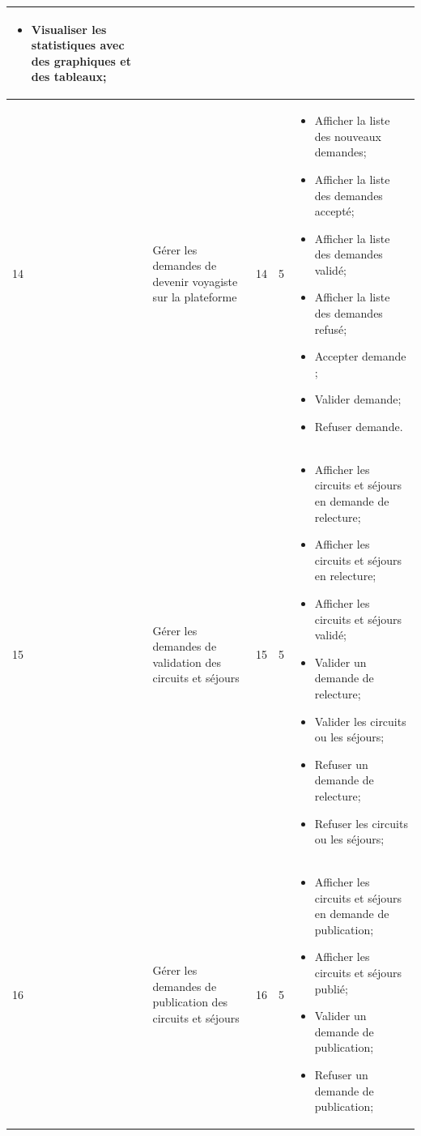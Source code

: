\documentclass[12pt]{report}
\begin{document}
\begin{longtable}{|p{1cm}|p{3cm}|p{2cm}|p{2cm}|p{6cm}|}
						\begin{itemize}
							\item Visualiser les statistiques avec des graphiques et des tableaux;
						\end{itemize}
						\\
						\hline
						 14&Gérer les demandes de devenir voyagiste sur la plateforme&14&5&
						\begin{itemize}
							\item Afficher la liste des nouveaux demandes;
							\item Afficher la liste des demandes accepté;
							\item Afficher la liste des demandes validé;
							\item Afficher la liste des demandes refusé;
							\item Accepter demande ;
							\item Valider demande;
							\item Refuser demande.
						\end{itemize}
						\\
						\hline
						 15&Gérer les demandes de validation des circuits et séjours&15&5&
						\begin{itemize}
							\item Afficher les circuits et séjours en demande de relecture;
							\item Afficher les circuits et séjours en relecture;
							\item Afficher les circuits et séjours validé;
							\item Valider un demande de relecture;
							\item Valider les circuits ou les séjours;
							\item Refuser un demande de relecture;
							\item Refuser les circuits ou les séjours;
						\end{itemize}
						\\
						\hline
						 16&Gérer les demandes de publication des circuits et séjours&16&5&
						\begin{itemize}
							\item Afficher les circuits et séjours en demande de publication;
							\item Afficher les circuits et séjours publié;
							\item Valider un demande de publication;
							\item Refuser un demande de publication;
						\end{itemize}

\end{longtable}
\end{document}
